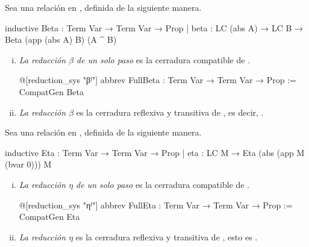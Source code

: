 \begin{defn}
Sea  una relación en , definida de la siguiente manera.
\begin{leancode}
inductive Beta : Term Var → Term Var → Prop
  | beta : LC (abs A) → LC B → Beta (app (abs A) B) (A ^ B)
\end{leancode}

\begin{enumerate}[(i)]
\item \textit{La reducción $\beta$ de un solo paso} es la cerradura compatible de .
\begin{leancode}
@[reduction_sys "βᶠ"]
abbrev FullBeta : Term Var → Term Var → Prop := CompatGen Beta
\end{leancode}
\item \textit{La reducción $\beta$} es la cerradura reflexiva y transitiva de ,
es decir, .
\end{enumerate}

\end{defn}

\begin{defn}
Sea  una relación en , definida de la siguiente manera.
\begin{leancode}
inductive Eta : Term Var → Term Var → Prop
  | eta : LC M → Eta (abs (app M (bvar 0))) M
\end{leancode}

\begin{enumerate}[(i)]
\item \textit{La reducción $\eta$ de un solo paso} es la cerradura compatible de .
\begin{leancode}
@[reduction_sys "ηᶠ"]
abbrev FullEta : Term Var → Term Var → Prop := CompatGen Eta
\end{leancode}
\item \textit{La reducción $\eta$} es la cerradura reflexiva y transitiva de ,
esto es .
\end{enumerate}

\end{defn}